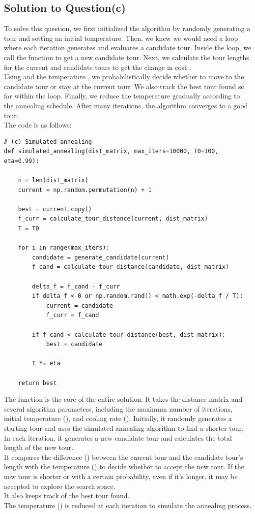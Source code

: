 \documentclass[a4paper]{article}
\begin{document}
\subsection{Solution to Question(c)}
To solve this question, we first initialized the algorithm by randomly generating a tour and setting an initial temperature. Then, we knew we would need a loop where each iteration generates and evaluates a candidate tour. Inside the loop, we call the  function to get a new candidate tour. Next, we calculate the tour lengths for the current and candidate tours to get the change in cost .\\
Using  and the temperature , we probabilistically decide whether to move to the candidate tour or stay at the current tour. We also track the best tour found so far within the loop. Finally, we reduce the temperature  gradually according to the annealing schedule. After many iterations, the algorithm converges to a good tour.\\
The code is as follows:
\begin{verbatim}
# (c) Simulated annealing
def simulated_annealing(dist_matrix, max_iters=10000, T0=100, eta=0.99):

    n = len(dist_matrix)
    current = np.random.permutation(n) + 1

    best = current.copy()
    f_curr = calculate_tour_distance(current, dist_matrix)
    T = T0

    for i in range(max_iters):
        candidate = generate_candidate(current)
        f_cand = calculate_tour_distance(candidate, dist_matrix)

        delta_f = f_cand - f_curr
        if delta_f < 0 or np.random.rand() < math.exp(-delta_f / T):
            current = candidate
            f_curr = f_cand

        if f_cand < calculate_tour_distance(best, dist_matrix):
            best = candidate

        T *= eta

    return best
\end{verbatim}
The  function is the core of the entire solution. It takes the distance matrix  and several algorithm parameters, including the maximum number of iterations, initial temperature (), and cooling rate (). Initially, it randomly generates a starting tour and uses the simulated annealing algorithm to find a shorter tour.\\
In each iteration, it generates a new candidate tour and calculates the total length of the new tour.\\
It compares the difference () between the current tour and the candidate tour's length with the temperature () to decide whether to accept the new tour. If the new tour is shorter or with a certain probability, even if it's longer, it may be accepted to explore the search space.\\
It also keeps track of the best tour found.\\
The temperature () is reduced at each iteration to simulate the annealing process.\\
\end{document}
